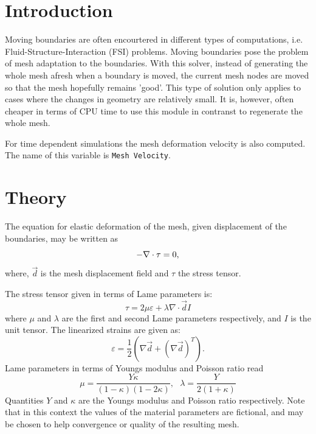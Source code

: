 
\begin{versiona}

\section{Introduction}

Moving boundaries are often encourtered in different types of computations,
i.e. Fluid-Structure-Interaction (FSI) problems.
Moving boundaries pose the problem of mesh adaptation to the boundaries.
With this solver, instead of generating the
whole mesh afresh when a boundary is moved, the current mesh nodes are moved
so that the mesh hopefully remains 'good'. This type of solution only applies
to cases where the changes in geometry are relatively small. It is, however, 
often cheaper in terms of CPU time to use this module in contranst to regenerate
the whole mesh.

For time dependent simulations the mesh deformation velocity is also computed.
The name of this variable is {\tt Mesh Velocity}.

\section{Theory}

The equation for elastic deformation of the mesh, given displacement of the boundaries,
may be written as
\begin{equation}
-\nabla\cdot {\bf \tau} = 0,
\end{equation}
where, $\Vec{d}$ is the mesh displacement field and $\tau$ the stress tensor.

The stress tensor given in terms of Lame parameters is:
\begin{equation}
\tau = 2 \mu \varepsilon + \lambda\nabla\cdot\Vec{d} I
\end{equation}
where $\mu$ and $\lambda$ are the first and second Lame parameters respectively,
and $I$ is the unit tensor.
The linearized strains are given as:
\begin{equation}
\varepsilon = \frac{1}{2}(\nabla{\Vec{d}} + (\nabla{\Vec{d}})^T).
\end{equation}
Lame parameters in terms of Youngs modulus and
Poisson ratio read
\begin{equation}
 \mu = \frac{Y \kappa}{( 1 - \kappa ) ( 1-2\kappa )},\ \ \  
 \lambda = \frac{Y}{2(1+\kappa)}
\end{equation}
Quantities $Y$ and $\kappa$ are the Youngs modulus and Poisson ratio respectively.
Note that in this context the values of the material parameters are fictional, and may
be chosen to help convergence or quality of the resulting mesh.



\end{versiona}
